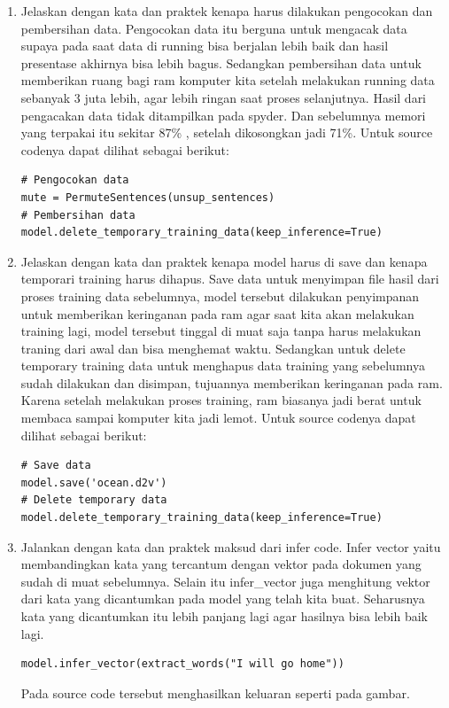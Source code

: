 \begin{enumerate}
\item Jelaskan dengan kata dan praktek kenapa harus dilakukan pengocokan dan pembersihan data.
\subitem Pengocokan data itu berguna untuk mengacak data supaya pada saat data di running bisa berjalan lebih baik dan hasil presentase akhirnya bisa lebih bagus. Sedangkan pembersihan data untuk memberikan ruang bagi ram komputer kita setelah melakukan running data sebanyak 3 juta lebih, agar lebih ringan saat proses selanjutnya. Hasil dari pengacakan data tidak ditampilkan pada spyder. Dan sebelumnya memori yang terpakai itu sekitar 87\% , setelah dikosongkan jadi 71\%. Untuk source codenya dapat dilihat sebagai berikut:
\begin{verbatim}
# Pengocokan data
mute = PermuteSentences(unsup_sentences)
# Pembersihan data
model.delete_temporary_training_data(keep_inference=True)
\end{verbatim}
\item Jelaskan dengan kata dan praktek kenapa model harus di save dan kenapa temporari training harus dihapus.
\subitem Save data untuk menyimpan file hasil dari proses training data sebelumnya, model tersebut dilakukan penyimpanan untuk memberikan keringanan pada ram agar saat kita akan melakukan training lagi, model tersebut tinggal di muat saja tanpa harus melakukan traning dari awal dan bisa menghemat waktu. Sedangkan untuk delete temporary training data untuk menghapus data training yang sebelumnya sudah dilakukan dan disimpan, tujuannya memberikan keringanan pada ram. Karena setelah melakukan proses training, ram biasanya jadi berat untuk membaca sampai komputer kita jadi lemot. Untuk source codenya dapat dilihat sebagai berikut:
\begin{verbatim}
# Save data
model.save('ocean.d2v')
# Delete temporary data
model.delete_temporary_training_data(keep_inference=True)
\end{verbatim}
\item Jalankan dengan kata dan praktek maksud dari infer code.
\subitem Infer vector yaitu membandingkan kata yang tercantum dengan vektor pada dokumen yang sudah di muat sebelumnya. Selain itu infer\_vector juga menghitung vektor dari kata yang dicantumkan pada model yang telah kita buat. Seharusnya kata yang dicantumkan itu lebih panjang lagi agar hasilnya bisa lebih baik lagi.
\begin{verbatim}
model.infer_vector(extract_words("I will go home"))
\end{verbatim}
\subitem Pada source code tersebut menghasilkan keluaran seperti pada gambar.
\begin{figure}[!htbp]

\end{figure}
\end{enumerate}
